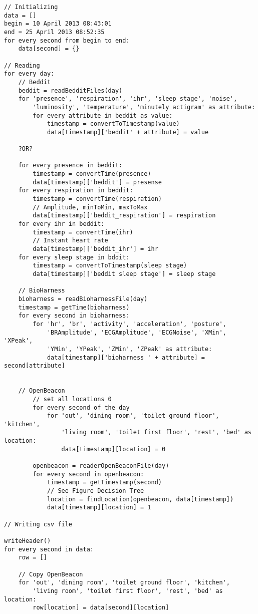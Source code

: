\pagebreak

\lstset{
	language=Python,
	numbers=left,
	numberstyle=\tiny,
	frame=tb,
	basicstyle=\small,
	tabsize=2,
}
\begin{lstlisting}[caption=Pseudocode]
// Initializing
data = []
begin = 10 April 2013 08:43:01
end = 25 April 2013 08:52:35
for every second from begin to end:
	data[second] = {}

// Reading
for every day:
	// Beddit
	beddit = readBedditFiles(day)
	for 'presence', 'respiration', 'ihr', 'sleep stage', 'noise',
		'luminosity', 'temperature', 'minutely actigram' as attribute:
		for every attribute in beddit as value:
			timestamp = convertToTimestamp(value)
			data[timestamp]['beddit' + attribute] = value

	?OR?

	for every presence in beddit:
		timestamp = convertTime(presence)
		data[timestamp]['beddit'] = presense
	for every respiration in beddit:
		timestamp = convertTime(respiration)
		// Amplitude, minToMin, maxToMax
		data[timestamp]['beddit_respiration'] = respiration
	for every ihr in beddit:
		timestamp = convertTime(ihr)
		// Instant heart rate
		data[timestamp]['beddit_ihr'] = ihr
	for every sleep stage in bddit:
		timestamp = convertToTimestamp(sleep stage)
		data[timestamp]['beddit sleep stage'] = sleep stage

	// BioHarness
	bioharness = readBioharnessFile(day)
	timestamp = getTime(bioharness)
	for every second in bioharness:
		for 'hr', 'br', 'activity', 'acceleration', 'posture',
			'BRAmplitude', 'ECGAmplitude', 'ECGNoise', 'XMin', 'XPeak',
			'YMin', 'YPeak', 'ZMin', 'ZPeak' as attribute:
			data[timestamp]['bioharness ' + attribute] = second[attribute]


	// OpenBeacon
		// set all locations 0
		for every second of the day
			for 'out', 'dining room', 'toilet ground floor', 'kitchen',
				'living room', 'toilet first floor', 'rest', 'bed' as location:
				data[timestamp][location] = 0

		openbeacon = readerOpenBeaconFile(day)
		for every second in openbeacon:
			timestamp = getTimestamp(second)
			// See Figure Decision Tree
			location = findLocation(openbeacon, data[timestamp])
			data[timestamp][location] = 1

// Writing csv file

writeHeader()
for every second in data:
	row = []

	// Copy OpenBeacon
	for 'out', 'dining room', 'toilet ground floor', 'kitchen',
		'living room', 'toilet first floor', 'rest', 'bed' as location:
		row[location] = data[second][location]


\end{lstlisting}
